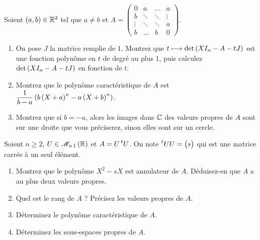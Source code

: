 \begin{corr}
\end{corr}

\begin{exoss}[Exercice 6]
Soient \(\left(a,b\right)\in\mathbb{R}^2\) tel que \(a\not=b\) et \(A=\begin{pmatrix}
0 & a & \dots & a \\
b & \ddots & \ddots & \vdots \\
\vdots & \ddots & \ddots & a \\
b & \dots & b & 0
\end{pmatrix}\).

\begin{enumerate}
    \item On pose \(J\) la matrice remplie de \(1\). Montrez que \(t\longmapsto\det\left(XI_n-A-tJ\right)\) est une fonction polynôme en \(t\) de degré au plus \(1\), puis calculez \(\det\left(XI_n-A-tJ\right)\) en fonction de \(t\). \\
    \item Montrez que le polynôme caractéristique de \(A\) est \(\dfrac{1}{b-a}\left(b\left(X+a\right)^n-a\left(X+b\right)^n\right)\). \\
    \item Montrez que si \(b=-a\), alors les images dans \(\mathbb{C}\) des valeurs propres de \(A\) sont sur une droite que vous préciserez, sinon elles sont sur un cercle.
\end{enumerate}
\end{exoss}

\begin{corr}
\end{corr}

\begin{exoss}[Exercice 7]
Soient \(n\geq2\), \(U\in\M{n\,1}[\R]\) et \(A=U\prescript{t}{}{U}\). On note \(\prescript{t}{}{U}U=\begin{pmatrix}
s
\end{pmatrix}\) qui est une matrice carrée à un seul élément.

\begin{enumerate}
    \item Montrez que le polynôme \(X^2-sX\) est annulateur de \(A\). Déduisez-en que \(A\) a au plus deux valeurs propres. \\
    \item Quel est le rang de \(A\) ? Précisez les valeurs propres de \(A\). \\
    \item Déterminez le polynôme caractéristique de \(A\). \\
    \item Déterminez les sous-espaces propres de \(A\).
\end{enumerate}
\end{exoss}

